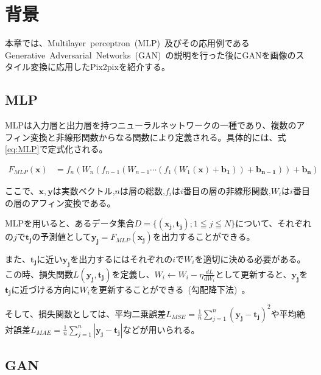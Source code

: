 
\chapter{背景}

本章では、Multilayer~perceptron~(MLP)~及びその応用例であるGenerative~Adversarial~Networks~(GAN)~の説明を行った後にGANを画像のスタイル変換に応用したPix2pixを紹介する。

\section{MLP}

MLPは入力層と出力層を持つニューラルネットワークの一種であり、複数のアフィン変換と非線形関数からなる関数により定義される。具体的には、式\ref{eq:MLP}で定式化される。

\begin{align}
    \label{eq:MLP}
    F_{MLP}(\boldsymbol{x})&=f_{n}(W_{n}(f_{n-1}(W_{n-1}\cdots(f_{1}(W_{1}(\boldsymbol{x})+\boldsymbol{b_{1}}))+\boldsymbol{b_{n-1}}))+\boldsymbol{b_{n}})
\end{align}

ここで、$\boldsymbol{x},\boldsymbol{y}$は実数ベクトル,$n$は層の総数,$f_{i}$は$i$番目の層の非線形関数,$W_{i}$は$i$番目の層のアフィン変換である。

MLPを用いると、あるデータ集合$D=\{(\boldsymbol{x_j},\boldsymbol{t_j}); 1 \leqq j \leqq N\}$について、それぞれの$j$で$\boldsymbol{t_{j}}$の予測値として$\boldsymbol{y_j}=F_{MLP}(\boldsymbol{x_j})$を出力することができる。

また、$\boldsymbol{t_j}$に近い$\boldsymbol{y_j}$を出力するにはそれぞれの$i$で$W_i$を適切に決める必要がある。この時、損失関数$L(\boldsymbol{y_j},\boldsymbol{t_j})$を定義し、$W _i \leftarrow W_i - \eta \frac{d L}{dW_i}$として更新すると、$\boldsymbol{y_j}$を$\boldsymbol{t_j}$に近づける方向に$W_i$を更新することができる~(勾配降下法)~。

そして、損失関数としては、平均二乗誤差$L_{MSE}=\frac{1}{n}\sum _{j=1} ^{n} {(\boldsymbol{y_j} - \boldsymbol{t_j})^2}$や平均絶対誤差$L_{MAE}=\frac{1}{n}\sum _{j=1} ^{n} {|\boldsymbol{y_j} - \boldsymbol{t_j}|}$などが用いられる。

\section{GAN}

